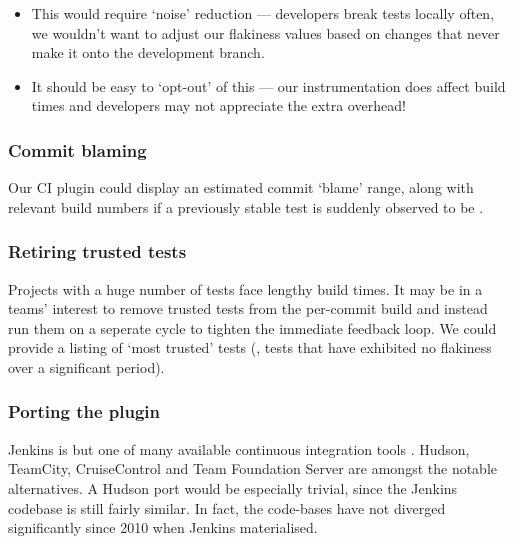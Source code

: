 \begin{itemize}
	\item This would require {\lq}noise{\rq} reduction --- developers break tests locally often, we wouldn't want to adjust our flakiness values based on changes that never make it onto the development branch.
	\item It should be easy to {\lq}opt-out{\rq} of this --- our instrumentation does affect build times and developers may not appreciate the extra overhead!
\end{itemize}

\subsubsection{Commit blaming}

Our CI plugin could display an estimated commit {\lq}blame{\rq} range, along with relevant build numbers if a previously stable test is suddenly observed to be \flaky{}.

\subsubsection{Retiring trusted tests}

Projects with a huge number of tests face lengthy build times. It may be in a teams' interest to remove trusted tests from the per-commit build and instead run them on a seperate cycle to tighten the immediate feedback loop. We could provide a listing of {\lq}most trusted{\rq} tests (\ie, tests that have exhibited no flakiness over a significant period).

\subsubsection{Porting the plugin}

Jenkins is but one of many available continuous integration tools \cite{ContinuousIntegrationSoftware}. Hudson, TeamCity, CruiseControl and Team Foundation Server are amongst the notable alternatives. A Hudson port would be especially trivial, since the Jenkins codebase is still fairly similar. In fact, the code-bases have not diverged significantly since 2010 when Jenkins materialised.

